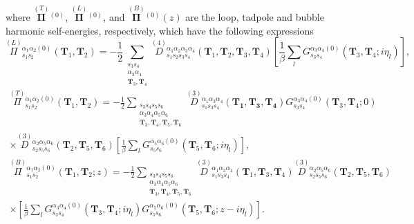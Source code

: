 where $\overset{(T)}{\boldsymbol{\Pi}}{}^{(0)}$, $\overset{(L)}{\boldsymbol{\Pi}}{}^{(0)}$, and $\overset{(B)}{\boldsymbol{\Pi}}{}^{(0)}(z)$ are the loop, tadpole and bubble harmonic self-energies, respectively, which have the 
following expressions
\begin{equation}
 \label{loop-diagram}
 \overset{(L)}{\Pi}{}_{s_{1}s_{2}}^{\alpha_{1}\alpha_{2}(0)}(\mathbf{T}_{1},\mathbf{T}_{2})=-\frac{1}{2}\sum\limits_{\substack{s_{3}s_{4} \\ \alpha_{3}\alpha_{4} \\ \mathbf{T}_{3},\mathbf{T}_{4}}}
 \overset{(4)}{D}{}^{\alpha_{1}\alpha_{2}\alpha_{3}\alpha_{4}}_{s_{1}s_{2}s_{3}s_{4}}(\mathbf{T}_{1},\mathbf{T}_{2},\mathbf{T}_{3},\mathbf{T}_{4})\left[\frac{1}{\beta}\sum_{l}G_{s_{3}s_{4}}^{\alpha_{3}\alpha_{4}(0)}(
 \mathbf{T}_{3},\mathbf{T}_{4};i\eta_{l})\right],
\end{equation}
\begin{multline}
 \label{tadpole-diagram}
 \overset{(T)}{\Pi}{}^{\alpha_{1}\alpha_{2}(0)}_{s_{1}s_{2}}(\mathbf{T}_{1},\mathbf{T}_{2})=-\frac{1}{2}\sum\limits_{\substack{s_{3}s_{4}s_{5}s_{6} \\ \alpha_{3}\alpha_{4}\alpha_{5}\alpha_{6} \\ \mathbf{T}_{3},\mathbf{T}_{4},
 \mathbf{T}_{5},\mathbf{T}_{6}}}\overset{(3)}{D}{}_{s_{1}s_{3}s_{4}}^{\alpha_{1}\alpha_{3}\alpha_{4}}(\mathbf{T_{1},\mathbf{T}_{3},\mathbf{T}_{4}})G_{s_{3}s_{4}}^{\alpha_{3}\alpha_{4}(0)}(\mathbf{T}_{3},\mathbf{T}_{
 4};0) \\ \times\overset{(3)}{D}{}_{s_{2}s_{5}s_{6}}^{\alpha_{2}\alpha_{5}\alpha_{6}}(\mathbf{T}_{2},\mathbf{T}_{5},\mathbf{T}_{6})\left[\frac{1}{\beta}\sum_{l}G_{s_{5}s_{6}}^{\alpha_{5}\alpha_{6}(0)}(\mathbf{T}_{5},\mathbf{T}_{
 6};i\eta_{l})\right],
\end{multline}
\begin{multline}
 \label{bubble-diagram}
 \overset{(B)}{\Pi}{}_{s_{1}s_{2}}^{\alpha_{1}\alpha_{2}(0)}(\mathbf{T}_{1},\mathbf{T}_{2};z)=-\frac{1}{2}\sum\limits_{\substack{s_{3}s_{4}s_{5}s_{6} \\ \alpha_{3}\alpha_{4}\alpha_{5}\alpha_{6} \\ \mathbf{T}_{3},\mathbf{T}_{4},
 \mathbf{T}_{5},\mathbf{T}_{6}}}\overset{(3)}{D}{}_{s_{1}s_{3}s_{4}}^{\alpha_{1}\alpha_{3}\alpha_{4}}(\mathbf{T}_{1},\mathbf{T}_{3},\mathbf{T}_{4})\overset{(3)}{D}{}_{s_{2}s_{5}s_{6}}^{\alpha_{2}\alpha_{5}\alpha_{6}}(\mathbf{
 T}_{2},\mathbf{T}_{5},\mathbf{T}_{6}) \\ \times\left[\frac{1}{\beta}\sum_{l}G_{s_{3}s_{4}}^{\alpha_{3}\alpha_{4}(0)}(\mathbf{T}_{3},\mathbf{T}_{4};i\eta_{l})G_{s_{5}s_{6}}^{\alpha_{5}\alpha_{6}(0)}(\mathbf{T}_{5},\mathbf{
 T}_{6};z-i\eta_{l})\right].
\end{multline}
